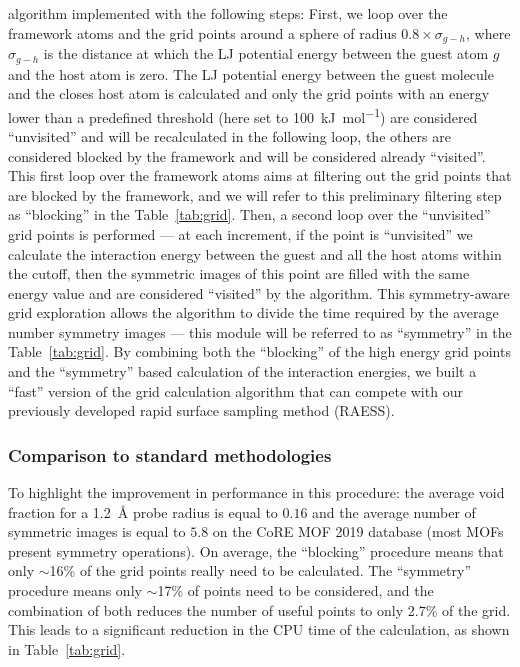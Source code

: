 \documentclass[main]{subfiles}
\begin{document}
algorithm implemented with the following steps:
First, we loop over the framework atoms and the grid points around a sphere of radius $0.8\times\sigma_{g-h}$, where $\sigma_{g-h}$ is the distance at which the LJ potential energy between the guest atom $g$ and the host atom is zero. The LJ potential energy between the guest molecule and the closes host atom is calculated and only the grid points with an energy lower than a predefined threshold (here set to \SI{100}{\kilo\joule\per\mole}) are considered ``unvisited'' and will be recalculated in the following loop, the others are considered blocked by the framework and will be considered already ``visited''. This first loop over the framework atoms aims at filtering out the grid points that are blocked by the framework, and we will refer to this preliminary filtering step as ``blocking'' in the Table~\ref{tab:grid}. Then, a second loop over the ``unvisited'' grid points is performed --- at each increment, if the point is ``unvisited'' we calculate the interaction energy between the guest and all the host atoms within the cutoff, then the symmetric images of this point are filled with the same energy value and are considered ``visited'' by the algorithm. This symmetry-aware grid exploration allows the algorithm to divide the time required by the average number symmetry images --- this module will be referred to as ``symmetry'' in the Table~\ref{tab:grid}. By combining both the ``blocking'' of the high energy grid points and the ``symmetry'' based calculation of the interaction energies, we built a ``fast'' version of the grid calculation algorithm that can compete with our previously developed rapid surface sampling method (RAESS).

\subsubsection{Comparison to standard methodologies}

To highlight the improvement in performance in this procedure: the average void fraction for a \SI{1.2}{\angstrom} probe radius is equal to $0.16$ and the average number of symmetric images is equal to $5.8$ on the CoRE MOF 2019 database (most MOFs present symmetry operations). On average, the ``blocking'' procedure means that only {$\sim$16\%} of the grid points really need to be calculated. The ``symmetry'' procedure means only {$\sim$17\%} of points need to be considered, and the combination of both reduces the number of useful points to only {2.7\%} of the grid. This leads to a significant reduction in the CPU time of the calculation, as shown in Table~\ref{tab:grid}.
\end{document}
